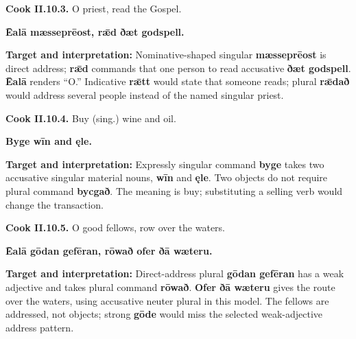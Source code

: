 \par\begin{minipage}{\linewidth}\raggedright
\textbf{Cook II.10.3.} O priest, read the Gospel.

\textbf{Ēalā mæsseprēost, rǣd ðæt godspell.}

\textbf{Target and interpretation:} Nominative-shaped singular \textbf{mæsseprēost} is direct address; \textbf{rǣd} commands that one person to read accusative \textbf{ðæt godspell}. \textbf{Ēalā} renders “O.” Indicative \textbf{rǣtt} would state that someone reads; plural \textbf{rǣdað} would address several people instead of the named singular priest.

\end{minipage}\par\addvspace{4pt}

\par\begin{minipage}{\linewidth}\raggedright
\textbf{Cook II.10.4.} Buy (sing.) wine and oil.

\textbf{Byge wīn and ęle.}

\textbf{Target and interpretation:} Expressly singular command \textbf{byge} takes two accusative singular material nouns, \textbf{wīn} and \textbf{ęle}. Two objects do not require plural command \textbf{bycgað}. The meaning is buy; substituting a selling verb would change the transaction.

\end{minipage}\par\addvspace{4pt}

\par\begin{minipage}{\linewidth}\raggedright
\textbf{Cook II.10.5.} O good fellows, row over the waters.

\textbf{Ēalā gōdan gefēran, rōwað ofer ðā wæteru.}

\textbf{Target and interpretation:} Direct-address plural \textbf{gōdan gefēran} has a weak adjective and takes plural command \textbf{rōwað}. \textbf{Ofer ðā wæteru} gives the route over the waters, using accusative neuter plural in this model. The fellows are addressed, not objects; strong \textbf{gōde} would miss the selected weak-adjective address pattern.

\end{minipage}\par\addvspace{4pt}

